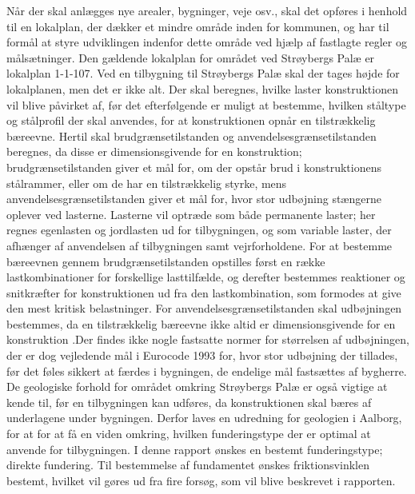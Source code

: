 \indent{     }  Når der skal anlægges nye arealer, bygninger, veje osv., skal det opføres i henhold til en lokalplan, der dækker et mindre område inden for kommunen, og har til formål at styre udviklingen indenfor dette område ved hjælp af fastlagte regler og målsætninger. Den gældende lokalplan for området ved Strøybergs Palæ er lokalplan 1-1-107.
\newline
\newline
Ved en tilbygning til Strøybergs Palæ skal der tages højde for lokalplanen, men det er ikke alt. Der skal beregnes, hvilke laster konstruktionen vil blive påvirket af, før det efterfølgende er muligt at bestemme, hvilken ståltype og stålprofil der skal anvendes, for at konstruktionen opnår en tilstrækkelig bæreevne. Hertil skal brudgrænsetilstanden og anvendelsesgrænsetilstanden beregnes, da disse er dimensionsgivende for en konstruktion; brudgrænsetilstanden giver et mål for, om der opstår brud i konstruktionens stålrammer, eller om de har en tilstrækkelig styrke, mens anvendelsesgrænsetilstanden giver et mål for, hvor stor udbøjning stængerne oplever ved lasterne.
\indent{     }  Lasterne vil optræde som både permanente laster; her regnes egenlasten og jordlasten ud for tilbygningen, og som variable laster, der afhænger af anvendelsen af tilbygningen samt vejrforholdene.
\indent{     }  For at bestemme bæreevnen gennem brudgrænsetilstanden opstilles først en række lastkombinationer for forskellige lasttilfælde, og derefter bestemmes reaktioner og snitkræfter for konstruktionen ud fra den lastkombination, som formodes at give den mest kritisk belastninger. 
\indent{     }  For anvendelsesgrænsetilstanden skal udbøjningen bestemmes, da en tilstrækkelig bæreevne ikke altid er dimensionsgivende for en konstruktion .Der findes ikke nogle fastsatte normer for størrelsen af udbøjningen, der er dog vejledende mål i Eurocode 1993 for, hvor stor udbøjning der tillades, før det føles sikkert at færdes i bygningen, de endelige mål fastsættes af bygherre.
\newline
\newline
De geologiske forhold for området omkring Strøybergs Palæ er også vigtige at kende til, før en tilbygningen kan udføres, da konstruktionen skal bæres af underlagene under bygningen. Derfor laves en udredning for geologien i Aalborg, for at for at få en viden omkring, hvilken funderingstype der er optimal at anvende for tilbygningen. I denne rapport ønskes en bestemt funderingstype; direkte fundering. Til bestemmelse af fundamentet ønskes friktionsvinklen bestemt, hvilket vil gøres ud fra fire forsøg, som vil blive beskrevet i rapporten. 
